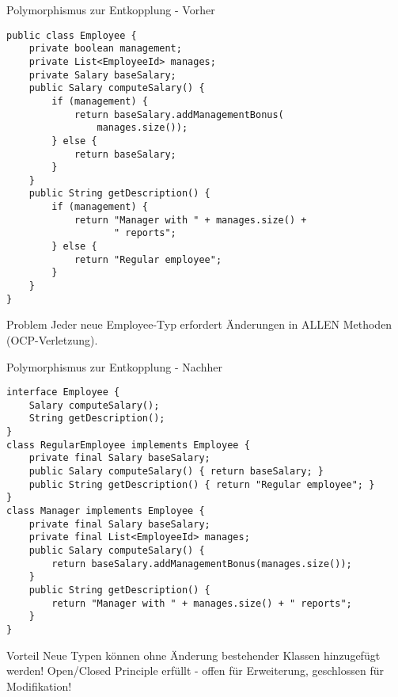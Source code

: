 \begin{frame}[fragile]{Polymorphismus zur Entkopplung - Vorher}
  \begin{lstlisting}[style=java, basicstyle=\tiny\ttfamily]
public class Employee {
    private boolean management;
    private List<EmployeeId> manages;
    private Salary baseSalary;
    public Salary computeSalary() {
        if (management) {
            return baseSalary.addManagementBonus(
                manages.size());
        } else {
            return baseSalary;
        }
    }
    public String getDescription() {
        if (management) {
            return "Manager with " + manages.size() +
                   " reports";
        } else {
            return "Regular employee";
        }
    }
}
  \end{lstlisting}
  \begin{alertblock}{Problem}
  Jeder neue Employee-Typ erfordert Änderungen in ALLEN Methoden (OCP-Verletzung).
  \end{alertblock}
\end{frame}

\begin{frame}[fragile]{Polymorphismus zur Entkopplung - Nachher}
  \begin{lstlisting}[style=java, basicstyle=\tiny\ttfamily]
interface Employee {
    Salary computeSalary();
    String getDescription();
}
class RegularEmployee implements Employee {
    private final Salary baseSalary;
    public Salary computeSalary() { return baseSalary; }
    public String getDescription() { return "Regular employee"; }
}
class Manager implements Employee {
    private final Salary baseSalary;
    private final List<EmployeeId> manages;
    public Salary computeSalary() {
        return baseSalary.addManagementBonus(manages.size());
    }
    public String getDescription() {
        return "Manager with " + manages.size() + " reports";
    }
}
  \end{lstlisting}
  \begin{exampleblock}{Vorteil}
  Neue Typen können ohne Änderung bestehender Klassen hinzugefügt werden!
  Open/Closed Principle erfüllt - offen für Erweiterung, geschlossen für Modifikation!
  \end{exampleblock}
\end{frame}

